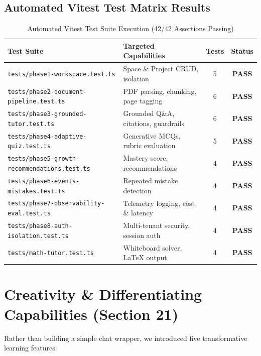 \documentclass[11pt,a4paper]{article}
\begin{document}
\subsection{Automated Vitest Test Matrix Results}
\begin{table}[h!]
\centering
\small
\begin{tabular}{llcc}
\toprule
\textbf{Test Suite} & \textbf{Targeted Capabilities} & \textbf{Tests} & \textbf{Status} \\
\midrule
\texttt{tests/phase1-workspace.test.ts} & Space \& Project CRUD, isolation & 5 & \textbf{PASS} \\
\texttt{tests/phase2-document-pipeline.test.ts} & PDF parsing, chunking, page tagging & 6 & \textbf{PASS} \\
\texttt{tests/phase3-grounded-tutor.test.ts} & Grounded Q\&A, citations, guardrails & 6 & \textbf{PASS} \\
\texttt{tests/phase4-adaptive-quiz.test.ts} & Generative MCQs, rubric evaluation & 5 & \textbf{PASS} \\
\texttt{tests/phase5-growth-recommendations.test.ts} & Mastery score, recommendations & 4 & \textbf{PASS} \\
\texttt{tests/phase6-events-mistakes.test.ts} & Repeated mistake detection & 4 & \textbf{PASS} \\
\texttt{tests/phase7-observability-eval.test.ts} & Telemetry logging, cost \& latency & 4 & \textbf{PASS} \\
\texttt{tests/phase8-auth-isolation.test.ts} & Multi-tenant security, session auth & 4 & \textbf{PASS} \\
\texttt{tests/math-tutor.test.ts} & Whiteboard solver, LaTeX output & 4 & \textbf{PASS} \\
\bottomrule
\end{tabular}
\caption{Automated Vitest Test Suite Execution (42/42 Assertions Passing)}
\end{table}

\section{Creativity \& Differentiating Capabilities (Section 21)}

Rather than building a simple chat wrapper, we introduced five transformative learning features:
\end{document}
